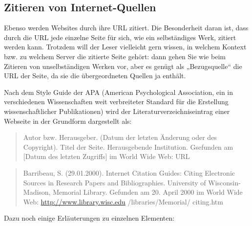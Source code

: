 \documentclass[]{book}
\theoremstyle{definition}
\theoremstyle{definition}
\theoremstyle{definition}
\theoremstyle{remark}
\begin{document}
\subsection{Zitieren von
Internet-Quellen}\label{zitieren-von-internet-quellen}

Ebenso werden Websites durch ihre URL zitiert. Die Besonderheit daran
ist, dass durch die URL jede einzelne Seite für sich, wie ein
selbständiges Werk, zitiert werden kann. Trotzdem will der Leser
vielleicht gern wissen, in welchem Kontext bzw. zu welchem Server die
zitierte Seite gehört: dann gehen Sie wie beim Zitieren von
unselbständigen Werken vor, aber es genügt als „Bezugsquelle`` die URL
der Seite, da sie die übergeordneten Quellen ja enthält.

Nach dem Style Guide der APA (American Psychological Association, ein in
verschiedenen Wissenschaften weit verbreiteter Standard für die
Erstellung wissenschaftlicher Publikationen) wird der
Literaturverzeichniseintrag einer Webseite in der Grundform dargestellt
als:

\begin{quote}
Autor bzw. Herausgeber. (Datum der letzten Änderung oder des Copyright).
Titel der Seite. Herausgebende Institution. Gsefunden am {[}Datum des
letzten Zugriffs{]} im World Wide Web: URL
\end{quote}

\begin{quote}
Barribeau, S. (29.01.2000). Internet Citation Guides: Citing Electronic
Sources in Research Papers and Bibliographies. University of
Wisconsin-Madison, Memorial Library. Gefunden am 20. April 2000 im World
Wide Web: \url{http://www.library.wisc.edu} /libraries/Memorial/
citing.htm
\end{quote}

Dazu noch einige Erläuterungen zu einzelnen Elementen:
\end{document}
